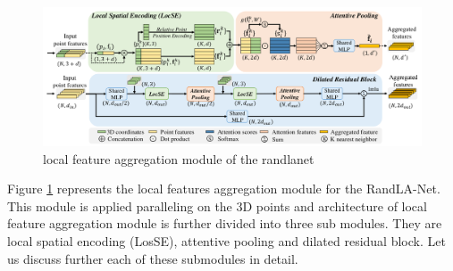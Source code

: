 \begin{figure}
    \includegraphics[scale=0.33]{images/localfeatueaggregation-randlanet.png}
    \caption{local feature aggregation module of the randlanet}
    \label{fig:randlanetlfa}
\end{figure}
Figure \ref{fig:randlanetlfa} represents the local features aggregation module for the RandLA-Net.
This module is applied paralleling on the 3D points and architecture of local feature aggregation module is further divided into three sub modules.
They are local spatial encoding (LosSE), attentive pooling and dilated residual block.
Let us discuss further each of these submodules in detail.

